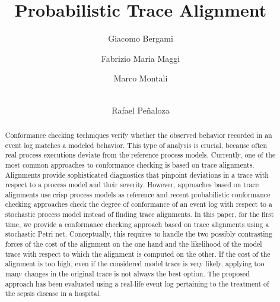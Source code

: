 \documentclass[runningheads]{llncs}
\begin{document}
%
\title{Probabilistic Trace Alignment}
%
%
\author{
	Giacomo Bergami \and
	Fabrizio Maria Maggi \and
	Marco Montali \and \\
	Rafael Pe\~naloza}

%

%
%
\maketitle              %
\linespread{0.95}

\begin{abstract}
Conformance checking techniques verify whether the observed behavior recorded in an event log matches a modeled behavior. This type of analysis is crucial, because often real process executions deviate from the reference process models. Currently, one of the most common approaches to conformance checking is based on trace alignments. Alignments provide sophisticated diagnostics that pinpoint deviations in a trace with respect to a process model and their severity. However, approaches based on trace alignments use crisp process models as reference and recent probabilistic conformance checking approaches check the degree of conformance of an event log with respect to a stochastic process model instead of finding trace alignments. In this paper, for the first time, we provide a conformance checking approach based on trace alignments using a stochastic Petri net. Conceptually, this requires to handle the two possibly contrasting forces of the cost of the alignment on the one hand and the likelihood of the model trace with respect to which the alignment is computed on the other. If the cost of the alignment is too high, even if the considered model trace is very likely, applying too many changes in the original trace is not always the best option. The proposed approach has been evaluated using a real-life event log pertaining to the treatment of the sepsis disease in a hospital.
\end{abstract}


%











\end{document}
